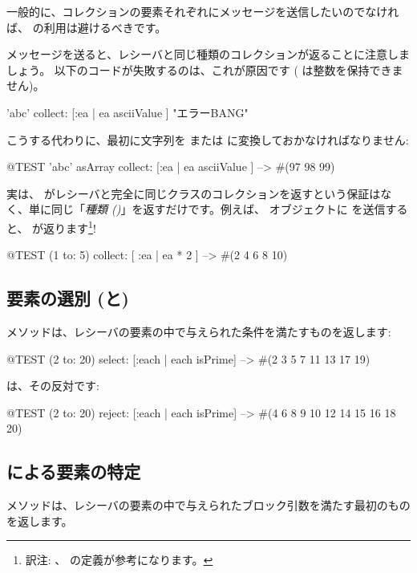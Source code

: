 \documentclass[a4paper,10pt,twoside]{book}
\begin{document}
一般的に、コレクションの要素それぞれにメッセージを送信したいのでなければ、 の利用は避けるべきです。

 メッセージを送ると、レシーバと同じ種類のコレクションが返ることに注意しましょう。
以下のコードが失敗するのは、これが原因です
( は整数を保持できません)。
\begin{code}{}
'abc' collect: [:ea | ea asciiValue ]      "エラーBANG"
\end{code}
\noindent
こうする代わりに、最初に文字列を  または  に変換しておかなければなりません:
\begin{code}{@TEST}
'abc' asArray collect: [:ea | ea asciiValue ] --> #(97 98 99)
\end{code}

実は、 がレシーバと完全に同じクラスのコレクションを返すという保証はなく、単に同じ「\emph{種類 ()}」を返すだけです。例えば、 オブジェクトに  を送信すると、 が返ります\footnote{訳注: 、 の定義が参考になります。}!
\begin{code}{@TEST}
(1 to: 5) collect: [ :ea | ea * 2 ] --> #(2 4 6 8 10)
\end{code}

\subsection{要素の選別 (と)}

 メソッドは、レシーバの要素の中で与えられた条件を満たすものを返します:

\begin{code}{@TEST}
(2 to: 20) select: [:each | each isPrime] --> #(2 3 5 7 11 13 17 19)
\end{code}

 は、その反対です:
\begin{code}{@TEST}
(2 to: 20) reject: [:each | each isPrime] --> #(4 6 8 9 10 12 14 15 16 18 20)
\end{code}

\subsection{ による要素の特定}
 メソッドは、レシーバの要素の中で与えられたブロック引数を満たす最初のものを返します。
\end{document}
